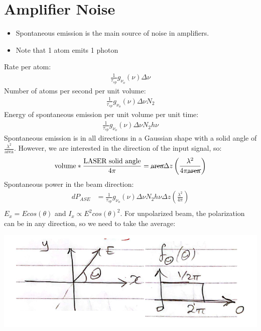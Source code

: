 \documentclass[11pt]{article}
\begin{document}
\section{Amplifier Noise}
\begin{itemize}
    \item Spontaneous emission is the main source of noise in amplifiers.
    \item Note that 1 atom emits 1 photon
\end{itemize}
Rate per atom:
\begin{align*}
    \frac{1}{\tau_{sp}} g_{\nu_o}(\nu) \Delta \nu
\end{align*}
Number of atoms per second per unit volume:
\begin{align*}
    \frac{1}{\tau_{sp}} g_{\nu_o}(\nu) \Delta \nu N_2 
\end{align*}
Energy of spontaneous emission per unit volume per unit time:
\begin{align*}
    \frac{1}{\tau_{sp}} g_{\nu_o}(\nu) \Delta \nu N_2 h \nu
\end{align*}
Spontaneous emission is in all directions in a Gaussian shape with a solid angle of $\frac{\lambda^2}{\text{area}}$. However, we are interested in the direction of the input signal, so:
\begin{align*}
    \text{volume} * \frac{\text{LASER solid angle}}{4\pi} = \cancel{\text{area}} \Delta z \left( \frac{\lambda^2}{4\pi \cancel{\text{area}}} \right) 
\end{align*}
Spontaneous power in the beam direction:
\begin{align*}
    dP_{ASE} &= \frac{1}{\tau_{sp}} g_{\nu_o}(\nu) \Delta \nu N_2 h \nu \Delta z \left( \frac{\lambda^2}{4\pi} \right) \\
\end{align*}
$E_x = E cos(\theta)$ and $I_x \propto E^2 cos(\theta)^2$.  For unpolarized beam, the polarization can be in any direction, so we need to take the average:
\begin{center}
    \includegraphics[scale=0.8]{4.png}
\end{center}
\end{document}
